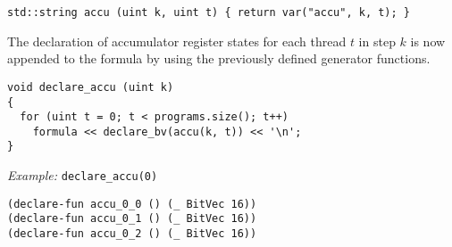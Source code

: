 \begin{lstlisting}[style=c++]
std::string accu (uint k, uint t) { return var("accu", k, t); }
\end{lstlisting}

\noindent
The declaration of accumulator register states for each thread $t$ in step $k$ is now appended to the formula by using the previously defined generator functions.

\begin{lstlisting}[style=c++]
void declare_accu (uint k)
{
  for (uint t = 0; t < programs.size(); t++)
    formula << declare_bv(accu(k, t)) << '\n';
}
\end{lstlisting}

\noindent
\emph{Example:} \lstinline[style=c++]{declare_accu(0)}

% 
\begin{lstlisting}[language=smtlib]
(declare-fun accu_0_0 () (_ BitVec 16))
(declare-fun accu_0_1 () (_ BitVec 16))
(declare-fun accu_0_2 () (_ BitVec 16))
\end{lstlisting}

